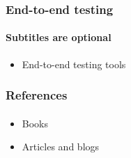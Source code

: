 \documentclass{beamer}
\begin{document}
\begin{frame}
	\frametitle{End-to-end testing}
	\framesubtitle{Subtitles are optional}
	\begin{itemize}
 		 \item End-to-end testing tools
	\end{itemize}
\end{frame}


\begin{frame}
	\frametitle{References}
	\framesubtitle{}
	\begin{itemize}
 		 \item Books
		 \item Articles and blogs
	\end{itemize}
\end{frame}




\end{document}
